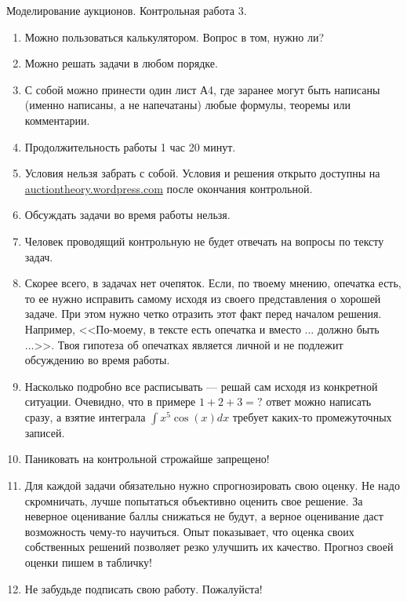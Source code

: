 \documentclass[pdftex,12pt,a4paper]{article}
\begin{document}


\begin{Large}
Моделирование аукционов. Контрольная работа 3.
\end{Large}

\begin{enumerate}
\item Можно пользоваться калькулятором. Вопрос в том, нужно ли?
\item Можно решать задачи в любом порядке.
\item С собой можно принести один лист А4, где заранее могут быть написаны (именно написаны, а не напечатаны) любые формулы, теоремы или комментарии.
\item Продолжительность работы 1 час 20 минут.
\item Условия нельзя забрать с собой. Условия и решения открыто доступны на \url{auctiontheory.wordpress.com} после окончания контрольной.
\item Обсуждать задачи во время работы нельзя.
\item Человек проводящий контрольную не будет отвечать на вопросы по тексту задач. 
\item Скорее всего, в задачах нет очепяток. Если, по твоему мнению, опечатка есть, то ее нужно исправить самому исходя из своего представления о хорошей задаче. При этом нужно четко отразить этот факт перед началом решения. Например, <<По-моему, в тексте есть опечатка и вместо ... должно быть ...>>. Твоя гипотеза об опечатках является личной и не подлежит обсуждению во время работы.
\item Насколько подробно все расписывать --- решай сам исходя из конкретной ситуации. Очевидно, что в примере $ 1+2+3=? $ ответ можно написать сразу, а взятие интеграла $ \int x^{5}\cos(x)dx $ требует каких-то промежуточных записей.
\item Паниковать на контрольной строжайше запрещено!
\item Для каждой задачи обязательно нужно спрогнозировать свою оценку. Не надо скромничать, лучше попытаться объективно оценить свое решение.  За неверное оценивание баллы снижаться не будут, а верное оценивание даст возможность чему-то научиться. Опыт показывает, что оценка своих собственных решений позволяет резко улучшить их качество. Прогноз своей оценки пишем в табличку!
\item Не забудьде подписать свою работу. Пожалуйста!

\end{enumerate}
\end{document}
